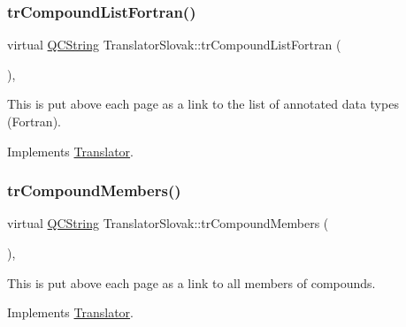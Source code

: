 \mbox{\label{class_translator_slovak_a3d7a9ccb7bc9541dbcca0a79caf75764}} 
\subsubsection{\texorpdfstring{trCompoundListFortran()}{trCompoundListFortran()}}
{\footnotesize\ttfamily virtual \mbox{\hyperlink{class_q_c_string}{Q\+C\+String}} Translator\+Slovak\+::tr\+Compound\+List\+Fortran (\begin{DoxyParamCaption}{ }\end{DoxyParamCaption})\hspace{0.3cm}{\ttfamily [inline]}, {\ttfamily [virtual]}}

This is put above each page as a link to the list of annotated data types (Fortran). 

Implements \mbox{\hyperlink{class_translator}{Translator}}.

\mbox{\label{class_translator_slovak_a8e5202a640e704a5b813d7e76a9f8ba1}} 
\subsubsection{\texorpdfstring{trCompoundMembers()}{trCompoundMembers()}}
{\footnotesize\ttfamily virtual \mbox{\hyperlink{class_q_c_string}{Q\+C\+String}} Translator\+Slovak\+::tr\+Compound\+Members (\begin{DoxyParamCaption}{ }\end{DoxyParamCaption})\hspace{0.3cm}{\ttfamily [inline]}, {\ttfamily [virtual]}}

This is put above each page as a link to all members of compounds. 

Implements \mbox{\hyperlink{class_translator}{Translator}}.

\mbox{\label{class_translator_slovak_afd013da1ac46ac4477a790c3b9d56df2}} 
